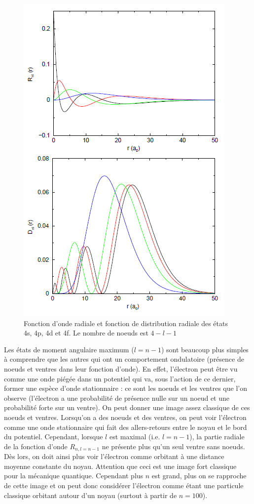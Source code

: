 \begin{figure}[htp]
    \centering
    \includegraphics{Images2/spdf.PNG}
    \caption{Fonction d'onde radiale et fonction de distribution radiale des états 4s, 4p, 4d et 4f. Le nombre de noeuds est $4-l-1$}
    \label{fig:fcx_rad_3}
\end{figure}

Les états de moment angulaire maximum ($l=n-1$) sont beaucoup plus simples à comprendre que les autres qui ont un comportement ondulatoire (présence de noeuds et ventres dans leur fonction d'onde). En effet, l'électron peut être vu comme une onde piégée dans un potentiel qui va, sous l'action de ce dernier, former une espèce d'onde stationnaire : ce sont les noeuds et les ventres que l'on observe (l'électron a une probabilité de présence nulle sur un noeud et une probabilité forte sur un ventre). On peut donner une image assez classique de ces noeuds et ventres. Lorsqu'on a des noeuds et des ventres, on peut voir l'électron comme une onde stationnaire qui fait des allers-retours entre le noyau et le bord du potentiel. Cependant, lorsque $l$ est maximal (i.e. $l=n-1$), la partie radiale de la fonction d'onde $R_{n,l=n-1}$ ne présente plus qu'un seul ventre sans noeuds. Dès lors, on doit ainsi plus voir l'électron comme orbitant à une distance moyenne constante du noyau. Attention que ceci est une image fort classique pour la mécanique quantique. Cependant plus $n$ est grand, plus on se rapproche de cette image et on peut donc considérer l'électron comme étant une particule classique orbitant autour d'un noyau (surtout à partir de $n=100$).

